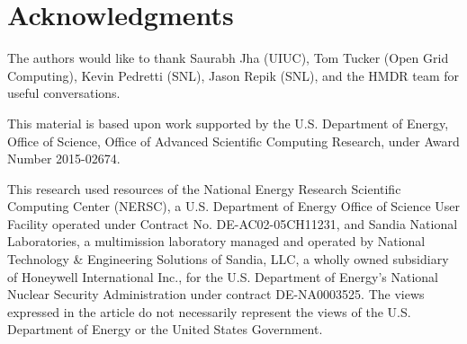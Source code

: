 \section*{Acknowledgments}
The authors would like to thank Saurabh Jha (UIUC), Tom Tucker (Open Grid Computing),
Kevin Pedretti (SNL), Jason Repik (SNL), and the HMDR team for useful conversations.

This material is based upon work supported by the U.S. Department of Energy,
Office of Science, Office of Advanced Scientific Computing Research, under Award Number 2015-02674.

This research used resources of the National Energy Research Scientific Computing Center (NERSC), a U.S. Department of Energy Office of Science User Facility operated under Contract No. DE-AC02-05CH11231, and Sandia National Laboratories, a multimission laboratory managed and operated
by National Technology \& Engineering Solutions of Sandia, LLC, a wholly owned
subsidiary of Honeywell International Inc., for the U.S. Department of Energy's
National Nuclear Security Administration under contract DE-NA0003525. The views
expressed in the article do not necessarily represent the views of the U.S. Department
of Energy or the United States Government.


